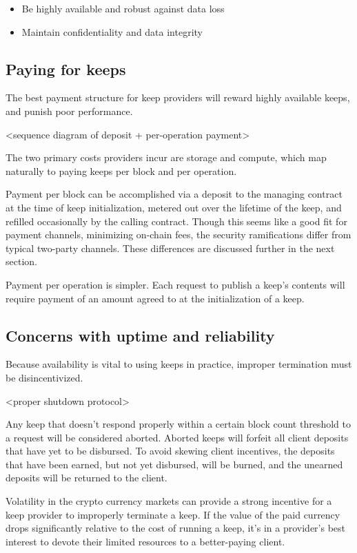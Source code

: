\documentclass[11pt]{article}
\begin{document}
\begin{itemize}
  \item Be highly available and robust against data loss
  \item Maintain confidentiality and data integrity
\end{itemize}

\subsection{Paying for keeps}

The best payment structure for keep providers will reward highly
available keeps, and punish poor performance.

<sequence diagram of deposit + per-operation payment>

The two primary costs providers incur are storage and compute, which
map naturally to paying keeps per block and per operation.

Payment per block can be accomplished via a deposit to the managing
contract at the time of keep initialization, metered out over the
lifetime of the keep, and refilled occasionally by the calling
contract. Though this seems like a good fit for payment channels,
minimizing on-chain fees, the security ramifications differ from
typical two-party channels. These differences are discussed further in
the next section.

Payment per operation is simpler. Each request to publish a keep's
contents will require payment of an amount agreed to at the
initialization of a keep.

\subsection{Concerns with uptime and reliability} \label{uptime}

Because availability is vital to using keeps in practice, improper
termination must be disincentivized.

<proper shutdown protocol>

Any keep that doesn't respond properly within a certain block count
threshold to a request will be considered aborted. Aborted keeps will
forfeit all client deposits that have yet to be disbursed. To avoid
skewing client incentives, the deposits that have been earned, but not
yet disbursed, will be burned, and the unearned deposits will be
returned to the client.

Volatility in the crypto currency markets can provide a strong
incentive for a keep provider to improperly terminate a keep. If the
value of the paid currency drops significantly relative to the cost of
running a keep, it's in a provider's best interest to devote their
limited resources to a better-paying client.
\end{document}
